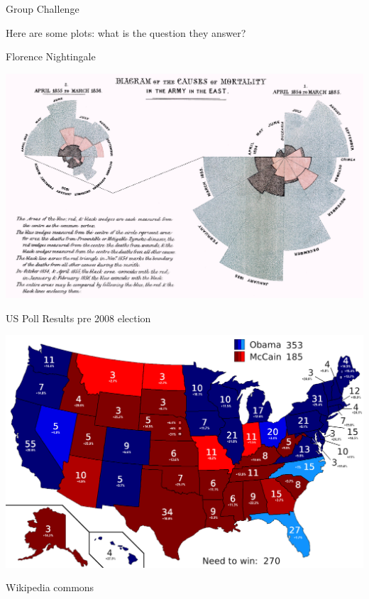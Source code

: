 \documentclass{beamer}
\begin{document}
\begin{frame}{Group Challenge}

Here are some plots: what is the question they answer?

\end{frame}

\begin{frame}{Florence Nightingale}

\begin{center}
\includegraphics[scale=1.0]{pics/wk2/Nightingale-mortality.jpg}
\end{center}

\end{frame}


\begin{frame}{US Poll Results pre 2008 election}

\begin{center}
\includegraphics[scale=0.2]{pics/wk2/us_map.png}
\end{center}

Wikipedia commons

\end{frame}
\end{document}
